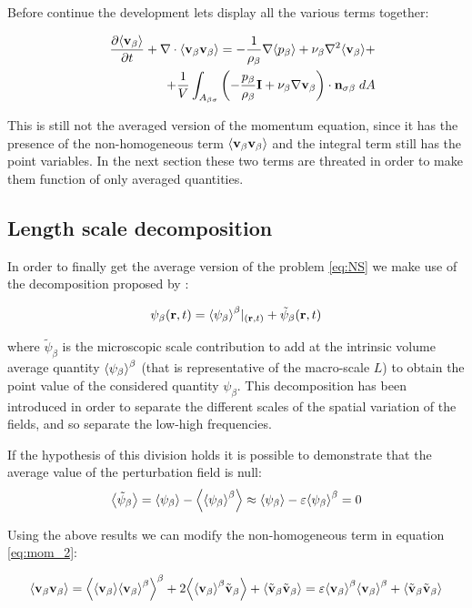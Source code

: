 Before continue the development lets display all the various terms together:

\begin{eqnarray}
&& \dfrac{\partial {\left< \textbf{v}_{\beta}\right>}}{\partial t} + \nabla \cdot {\left< \textbf{v}_{\beta}\textbf{v}_{\beta}\right>} = -\dfrac{1}{\rho_{\beta}} \nabla {\left< p_{\beta}\right>} + \nu_{\beta}\nabla^2 {\left< \textbf{v}_{\beta} \right>} + \nonumber \\
&& +\dfrac{1}{V} \int_{A_{\beta \sigma}} \left( -\dfrac{p_{\beta}}{\rho_{\beta}} \mathbf{I} + \nu_{\beta} \nabla \textbf{v}_{\beta}  \right)\cdot \mathbf{n}_{\sigma \beta} \;dA \nonumber \\
\label{eq:mom_2}
\end{eqnarray}

This is still not the averaged version of the momentum equation, since it has the presence of the non-homogeneous term ${\left< \textbf{v}_{\beta}\textbf{v}_{\beta} \right>}$ and the integral term still has the point variables.
In the next section these two terms are threated in order to make them function of only averaged quantities.

\subsection{Length scale decomposition}
In order to finally get the average version of the problem \eqref{eq:NS} we make use of the decomposition proposed by \citet{gray1975derivation}:

\begin{equation}
\psi_{\beta}(\mathbf{r},t) = {\left< \psi_{\beta} \right>}^{\beta}|_{(\mathbf{r},t)} + \tilde{\psi}_{\beta}(\mathbf{r},t)
\label{eq:gray}
\end{equation}

where $\tilde{\psi}_{\beta}$ is the microscopic scale contribution to add at the intrinsic volume average quantity $ {\left< \psi_{\beta} \right>}^{\beta}$ (that is representative of the macro-scale $L$) to obtain the point value of the considered quantity $\psi_{\beta}$.
This decomposition has been introduced in order to separate the different scales of the spatial variation of the fields, and so separate the low-high frequencies.

If the hypothesis of this division holds it is possible to demonstrate that the average value of the perturbation field is null:
$$
{\left< \tilde{\psi}_{\beta} \right>} = {\left< \psi_{\beta} \right>} - {\left< {\left< \psi_{\beta} \right>}^{\beta} \right>} \approx {\left< \psi_{\beta} \right>} -\varepsilon {\left< \psi_{\beta} \right>}^{\beta} = 0
$$

Using the above results we can modify the non-homogeneous term in equation \ref{eq:mom_2}:

\begin{equation}
{\left< \textbf{v}_{\beta}\textbf{v}_{\beta}\right>} = {\left< {\left< \textbf{v}_{\beta} \right>}{\left< \textbf{v}_{\beta} \right>}^{\beta} \right>}^{\beta} +2{\left< {\left< \textbf{v}_{\beta} \right>}^{\beta}\tilde{\textbf{v}}_{\beta} \right>} +{\left< \tilde{\textbf{v}}_{\beta} \tilde{\textbf{v}}_{\beta} \right>} = \varepsilon {\left< \textbf{v}_{\beta}\right>}^{\beta}{\left< \textbf{v}_{\beta} \right>}^{\beta} +{\left< \tilde{\textbf{v}}_{\beta}\tilde{\textbf{v}}_{\beta} \right>}
\label{eq:dec_1}
\end{equation}

